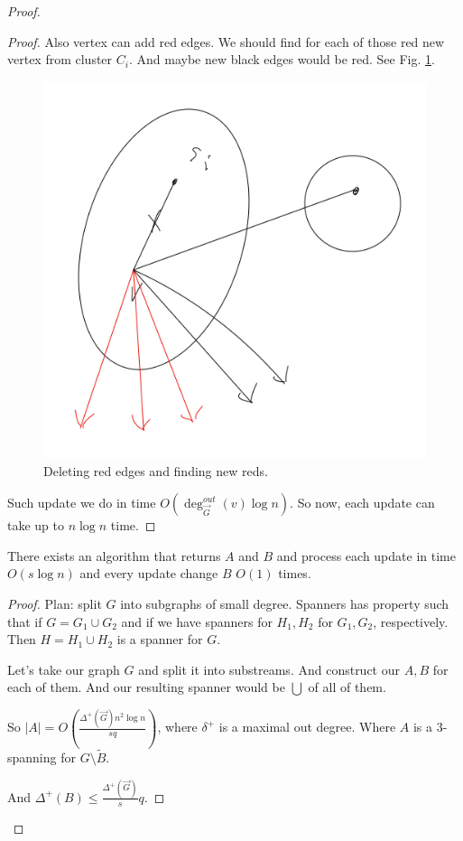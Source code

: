 \begin{proof}
\begin{proof}
	Also vertex can add red edges. We should find for each of those red new vertex from cluster $C_i$.
	And maybe new black edges would be red.
	See Fig. \ref{fig:proof_spanning_add_red_after_delete}.

	\begin{figure}[H]
		\centering
		\includegraphics[width=0.5\linewidth]{figures/proof_spanning_add_red_after_delete.jpeg}
		\caption{Deleting red edges and finding new reds.}
		\label{fig:proof_spanning_add_red_after_delete}
	\end{figure}

	Such update we do in time $O\left(\deg_{\vec G}^{out}(v) \log n\right)$. So now, each update can take up to $n \log n$ time.

	\end{proof}

	\begin{lm}[Alg2] \label{lm:spanning_alg_2}
	  There exists an algorithm that returns $A$ and $B$ and process each update in time $O(s \log n)$ and every update change $B$ $O(1)$ times.
	\end{lm}
	\begin{proof}
	  

	Plan: split $G$ into subgraphs of small degree.
	Spanners has property such that if $G = G_1 \cup G_2$ and if we have spanners for $H_1, H_2$ for $G_1, G_2$, respectively. Then $H = H_1 \cup H_2$ is a spanner for $G$.

	Let's take our graph $G$ and split it into substreams. 
	And construct our $A, B$ for each of them.
	And our resulting spanner would be $\bigcup$ of all of them.

	So $|A| = O\left(\frac{\Delta^+(\vec G) n^2 \log n}{s q}\right)$, where $\delta^+$ is a maximal out degree.
	Where $A$ is a 3-spanning for $G \setminus \tilde B$.

	And $\Delta^+(B) \leq \frac{\Delta^+(\vec G)} {s} q$.



\end{proof}
\end{proof}
